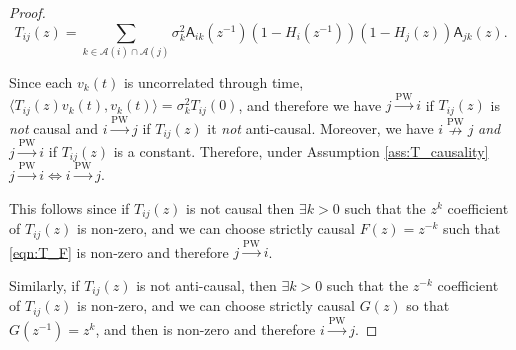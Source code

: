 \documentclass{statsoc}
\def\pwgc{\overset{\text{PW}}{\rightarrow}}  %
\def\npwgc{\overset{\text{PW}}{\nrightarrow}}  %
\def\A{\mathsf{A}}  %
\def\H{\mathcal{H}}  %
\newcommand{\linE}[2]{\hat{\E}[#1\ |\ #2]}  %
\newcommand{\anc}[1]{\mathcal{A}(#1)}  %
\def\defeq{\overset{\Delta}{=}}  %
\def\H{\mathcal{H}}  %
\def\E{\mathbb{E}}  %
\newcommand{\inner}[2]{\langle #1, #2 \rangle}  %
\begin{document}
\begin{proof}
  \begin{equation}
    T_{ij}(z) = \sum_{k \in \anc{i} \cap \anc{j}} \sigma_k^2\A_{ik}(z^{-1})(1 - H_i(z^{-1}))(1 - H_j(z))\A_{jk}(z).
  \end{equation}

  Since each $v_k(t)$ is uncorrelated through time,
  $\inner{T_{ij}(z)v_k(t)}{v_k(t)} = \sigma_k^2T_{ij}(0)$, and
  therefore we have $j \pwgc i$ if $T_{ij}(z)$ is \textit{not} causal
  and $i \pwgc j$ if $T_{ij}(z)$ it \textit{not} anti-causal.
  Moreover, we have $i \npwgc j$ \textit{and} $j \pwgc i$ if
  $T_{ij}(z)$ is a constant.  Therefore, under Assumption
  \ref{ass:T_causality} $j \pwgc i \iff i \pwgc j$.

  This follows since if $T_{ij}(z)$ is not causal then
  $\exists k > 0$ such that the $z^k$ coefficient of $T_{ij}(z)$ is
  non-zero, and we can choose strictly causal $F(z) = z^{-k}$ such
  that \eqref{eqn:T_F} is non-zero and therefore $j \pwgc i$.
  
  Similarly, if $T_{ij}(z)$ is not anti-causal, then
  $\exists k > 0$ such that the $z^{-k}$ coefficient of $T_{ij}(z)$ is
  non-zero, and we can choose strictly causal $G(z)$ so that
  $G(z^{-1}) = z^k$, and then  is non-zero and therefore
  $i \pwgc j$.
\end{proof}




\end{document}
